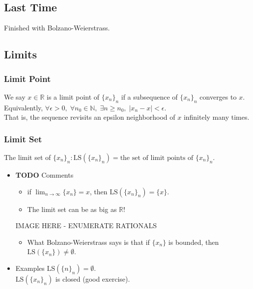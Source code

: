 \documentclass[11pt]{article}
\newcommand{\0}{\emptyset}
\newcommand{\N}{\mathbb{N}}
\newcommand{\R}{\mathbb{R}}
\begin{document}
\subsection*{Last Time}
\label{sec:org91d8deb}
Finished with Bolzano-Weierstrass.\\[0pt]
\subsection*{Limits}
\label{sec:org27ecc36}
\subsubsection*{Limit Point}
\label{sec:orgacc3774}
We say \(x\in\R\) is a limit point of \(\{x_{n}\}_{n}\) if a subsequence of \(\{x_{n}\}_{n}\) converges to \(x\).\\[0pt]
Equivalently, \(\forall\epsilon>0,\;\forall n_{0}\in\N,\;\exists n\geq n_{0},\;|x_{n}-x|<\epsilon\).\\[0pt]
That is, the sequence revisits an epsilon neighborhood of \(x\) infinitely many times.\\[0pt]
\subsubsection*{Limit Set}
\label{sec:orgd0ab69c}
The limit set of \(\{x_{n}\}_{n}:\text{LS}(\{x_{n}\}_{n})=\text{the set of limit points of }\{x_{n}\}_{n}\).\\[0pt]
\begin{itemize}
\item {\bfseries\sffamily TODO} Comments
\label{sec:orgb04a0ae}
\begin{itemize}
\item if \(\lim_{n\to\infty}\{x_{n}\}=x\), then \(\text{LS}(\{x_{n}\}_{n})=\{x\}\).\\[0pt]
\item The limit set can be as big as \(\R\)!\\[0pt]
\end{itemize}
IMAGE HERE - ENUMERATE RATIONALS\\[0pt]
\begin{itemize}
\item What Bolzano-Weierstrass says is that if \(\{x_{n}\}\) is bounded, then \(\text{LS}(\{x_{n}\})\neq\0\).\\[0pt]
\end{itemize}
\item Examples
\label{sec:orgcc5d3e9}
\(\text{LS}(\{n\}_{n})=\0\).\\[0pt]
\(\text{LS}(\{x_{n}\}_{n})\) is closed (good exercise).\\[0pt]
\end{itemize}
\end{document}
